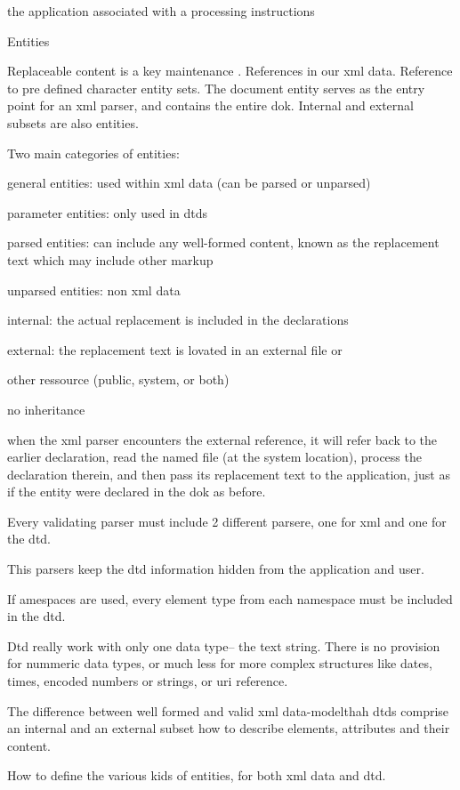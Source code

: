the application associated with a processing instructions

Entities

Replaceable content is a key maintenance . References in our xml data. Reference to pre defined character entity sets. The document entity serves as the entry point for an xml parser, and contains the entire dok. Internal and external subsets are also entities.

Two main categories of entities:

general entities: used within xml data (can be parsed or unparsed)

parameter entities: only used in dtds



parsed entities: can include any well-formed content, known  as the replacement text which may include other markup

unparsed entities: non xml data

internal: the actual replacement is included in the declarations

external: the replacement text is lovated in an external file or

other ressource (public, system, or both)

no inheritance

when the xml parser encounters the external reference, it will refer back to the earlier declaration, read the named file (at the system location), process the declaration therein, and then pass its replacement text to the application, just as if the entity were declared in the dok as before.

Every validating parser must include 2 different parsere, one for xml and one for the dtd.

This parsers keep the dtd information hidden from the application and user.

If amespaces are used, every element type from each namespace must be included in the dtd.

Dtd really work with only one data type-- the text string. There is no provision for nummeric data types, or much less for more complex structures like dates, times, encoded numbers or strings, or uri reference.

The difference between well formed and valid xml data-modelthah dtds comprise an internal and an external subset how to describe elements, attributes and their content.

How to define the various kids of entities, for both xml data and dtd.


